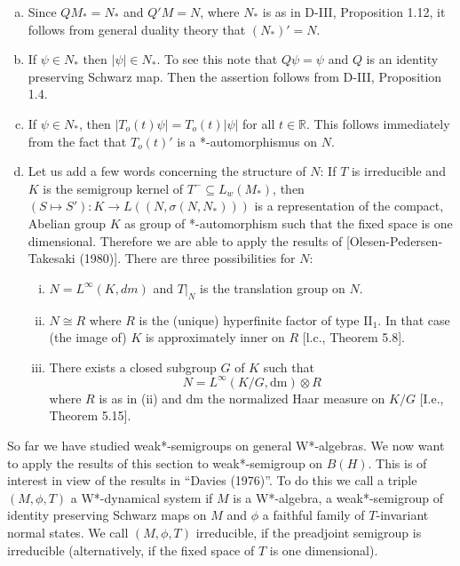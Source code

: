 \begin{remarks}\label{rem:d4-3-6}
\begin{enumerate}[(a)]
\item
Since $QM_{*} = N_{*}$ and $Q'M = N$, where $N_{*}$ is as in D-III, Proposition 1.12, it follows from general duality theory that $(N_{*})' = N$.

\item
If $\psi \in N_{*}$ then $|\psi| \in N_{*}$.
To see this note that $Q\psi = \psi$ and $Q$ is an identity preserving Schwarz map.
Then the assertion follows from D-III, Proposition 1.4.

\item
If $\psi \in N_{*}$, then $|T_{o}(t)\psi| = T_{o}(t)|\psi|$ for all $t \in \mathbb{R}$.
This follows immediately from the fact that $T_{o}(t)'$ is a *-automorphismus on $N$.

\item
Let us add a few words concerning the structure of $N$: If $T$ is irreducible and $K$ is the semigroup kernel of $T^{-} \subseteq L_{w}(M_{*})$, then $(S \mapsto S'): K \to L((N,\sigma(N,N_{*})))$ is a representation of the compact, Abelian group $K$ as group of *-automorphism such that the fixed space is one dimensional.
Therefore we are able to apply the results of [Olesen-Pedersen-Takesaki (1980)].
There are three possibilities for $N$:

\begin{enumerate}[(i)]
\item
$N = L^{\infty}(K,dm)$ and $T|_{N}$ is the translation group on $N$.

\item
$N \cong R$ where $R$ is the (unique) hyperfinite factor of type II$_{1}$.
In that case (the image of) $K$ is approximately inner on $R$ [l.c., Theorem 5.8].


\item
There exists a closed subgroup \(G\) of \(K\) such that
\[
N = L^{\infty}(K/G, \text{dm}) \otimes R
\]
where \(R\) is as in (ii) and \(\text{dm}\) the normalized Haar measure on \(K/G\) [I.e., Theorem 5.15].
\end{enumerate}
\end{enumerate}
\end{remarks}

\newpage
So far we have studied weak*-semigroups on general W*-algebras.
We now want to apply the results of this section to weak*-semigroup on \(B(H)\).
This is of interest in view of the results in \enquote{Davies (1976)}.
To do this we call a triple \((M,\phi,T)\) a W*-dynamical system if \(M\) is a W*-algebra, a weak*-semigroup of identity preserving Schwarz maps on \(M\) and \(\phi\) a faithful family of \(T\)-invariant normal states.
We call \((M,\phi,T)\) irreducible, if the preadjoint semigroup is irreducible (alternatively, if the fixed space of \(T\) is one dimensional).

